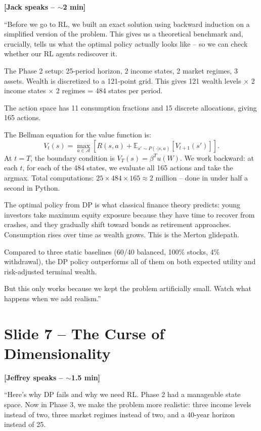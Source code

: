 \documentclass[11pt, letterpaper]{article}
\begin{document}
\textbf{[Jack speaks -- $\sim$2 min]}

``Before we go to RL, we built an exact solution using backward induction on a simplified version of the problem. This gives us a theoretical benchmark and, crucially, tells us what the optimal policy actually looks like -- so we can check whether our RL agents rediscover it.

The Phase 2 setup: 25-period horizon, 2 income states, 2 market regimes, 3 assets. Wealth is discretized to a 121-point grid. This gives 121 wealth levels $\times$ 2 income states $\times$ 2 regimes = 484 states per period.

The action space has 11 consumption fractions and 15 discrete allocations, giving 165 actions.

The Bellman equation for the value function is:
\[
V_t(s) = \max_{a \in \mathcal{A}} \left[ R(s, a) + \mathbb{E}_{s' \sim P(\cdot | s,a)}\left[ V_{t+1}(s') \right] \right].
\]
At $t = T$, the boundary condition is $V_T(s) = \beta^T u(W)$. We work backward: at each $t$, for each of the 484 states, we evaluate all 165 actions and take the argmax. Total computations: $25 \times 484 \times 165 \approx 2$ million -- done in under half a second in Python.

The optimal policy from DP is what classical finance theory predicts: young investors take maximum equity exposure because they have time to recover from crashes, and they gradually shift toward bonds as retirement approaches. Consumption rises over time as wealth grows. This is the Merton glidepath.

Compared to three static baselines (60/40 balanced, 100\% stocks, 4\% withdrawal), the DP policy outperforms all of them on both expected utility and risk-adjusted terminal wealth.

But this only works because we kept the problem artificially small. Watch what happens when we add realism.''

\section{Slide 7 -- The Curse of Dimensionality}

\textbf{[Jeffrey speaks -- $\sim$1.5 min]}

``Here's why DP fails and why we need RL. Phase 2 had a manageable state space. Now in Phase 3, we make the problem more realistic: three income levels instead of two, three market regimes instead of two, and a 40-year horizon instead of 25.
\end{document}
